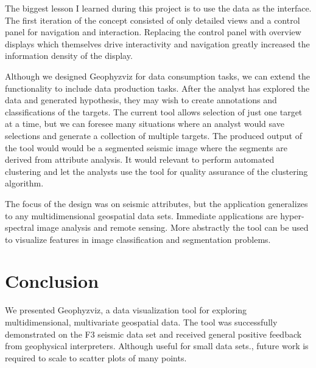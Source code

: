 \documentclass[journal]{vgtc}                %
\begin{document}
The biggest lesson I learned during this project is to use the data as the interface. The first iteration
of the concept consisted of only detailed views and a control panel for navigation and interaction.
Replacing the control panel with overview displays which themselves drive interactivity and navigation
greatly increased the information density of the display.

Although we designed Geophyzviz for data consumption tasks, we can extend the functionality
to include data production tasks. After the analyst has explored the data and generated hypothesis,
they may wish to create annotations and classifications of the targets. The current tool allows
selection of just one target at a time, but we can foresee many situations where an analyst would
save selections and generate a collection of multiple targets. The produced output of the tool would
would be a segmented seismic image where the segments are derived from attribute analysis. It would
relevant to perform automated clustering and let the analysts use the tool for quality assurance of
the clustering algorithm.

The focus of the design was on seismic attributes, but the application generalizes to any multidimensional
geospatial data sets. Immediate applications are hyper-spectral image analysis and remote sensing. More abstractly
the tool can be used to visualize features in image classification and segmentation problems.


\section{Conclusion}
We presented Geophyzviz, a data visualization tool for exploring multidimensional, multivariate
geospatial data. The tool was successfully demonstrated on the F3 seismic data set and received
general positive feedback from geophysical interpreters. Although useful for small data sets., future work is required to scale to scatter plots of many points. 




\end{document}
